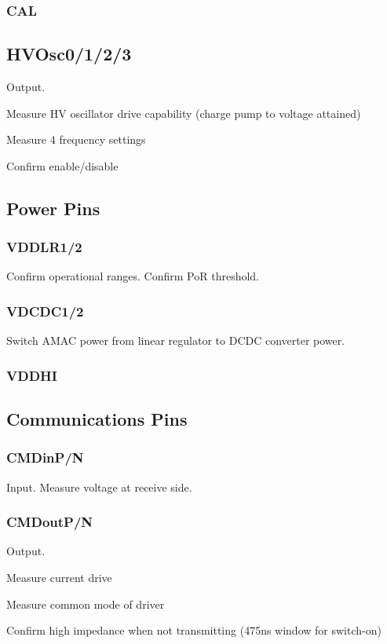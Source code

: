 \documentclass[11pt]{article}   			%
\begin{document}
\subsubsection{CAL}

\subsection{HVOsc0/1/2/3}
Output. 
\begin{compactitem}
    \item{Measure HV oscillator drive capability (charge pump to voltage attained)}
	\item{Measure 4 frequency settings}
	\item{ Confirm enable/disable}
\end{compactitem}

\subsection{Power Pins}

\subsubsection{VDDLR1/2}
Confirm operational ranges. Confirm PoR threshold.

\subsubsection{VDCDC1/2}
Switch AMAC power from linear regulator to DCDC converter power.

\subsubsection{VDDHI}

\subsection{Communications Pins}

\subsubsection{CMDinP/N}
Input. Measure voltage at receive side.

\subsubsection{CMDoutP/N}
Output.
\begin{compactitem}
    \item{Measure current drive}
    \item{Measure common mode of driver}
    \item{Confirm high impedance when not transmitting (475ns window for switch-on)}
\end{compactitem}
\end{document}
